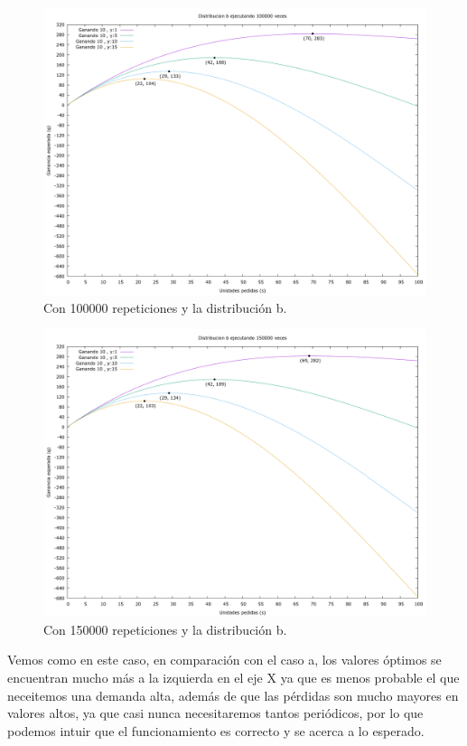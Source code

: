 \documentclass[12pt, spanish]{article}
\begin{document}
\begin{figure}[H]
	\centering
	\includegraphics[scale = 0.2]{prob_b/datos_b_100000.png}
	\caption{Con 100000 repeticiones y la distribución b.}
	\label{fig:ej1_a_100000}

\end{figure}

\begin{figure}[H]
	\centering
	\includegraphics[scale = 0.2]{prob_b/datos_b_150000.png}
	\caption{Con 150000 repeticiones y la distribución b.}
	\label{fig:ej1_a_150000}

\end{figure}


Vemos como en este caso, en comparación con el caso a, los valores óptimos se encuentran mucho más a la izquierda en el eje X ya que es menos probable el que neceitemos una demanda alta, además de que las pérdidas son mucho mayores en valores altos, ya que casi nunca necesitaremos tantos periódicos, por lo que podemos intuir que el funcionamiento es correcto y se acerca a lo esperado.
\end{document}
